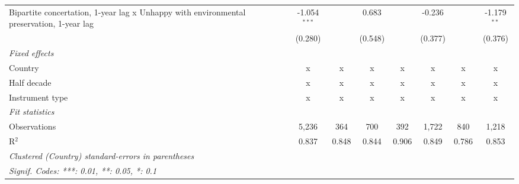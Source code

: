 \begin{table}[htbp]
\begin{tabular}{lccccccc}
      Bipartite concertation, 1-year lag x Unhappy with environmental preservation, 1-year lag & -1.054$^{***}$ &                           & 0.683          &                  & -0.236          &                 & -1.179$^{**}$\\   
                                                                                               & (0.280)        &                           & (0.548)        &                  & (0.377)         &                 & (0.376)\\   
      \emph{Fixed effects}\\
      Country                                                                                  & x              & x                         & x              & x                & x               & x               & x\\  
      Half decade                                                                              & x              & x                         & x              & x                & x               & x               & x\\  
      Instrument type                                                                          & x              & x                         & x              & x                & x               & x               & x\\  
      \midrule \emph{Fit statistics}\\
      Observations                                                                             & 5,236          & 364                       & 700            & 392              & 1,722           & 840             & 1,218\\  
      R$^2$                                                                                    & 0.837          & 0.848                     & 0.844          & 0.906            & 0.849           & 0.786           & 0.853\\  
      \midrule
      \multicolumn{8}{l}{\emph{Clustered (Country) standard-errors in parentheses}}\\
      \multicolumn{8}{l}{\emph{Signif. Codes: ***: 0.01, **: 0.05, *: 0.1}}\\
   \end{tabular}
\end{table}


